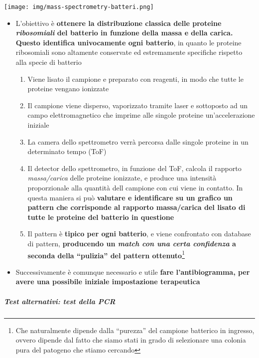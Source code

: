 \documentclass[italian,]{article}
\providecommand{\tightlist}{%
  \setlength{\itemsep}{0pt}\setlength{\parskip}{0pt}}
\begin{document}
\texttt{[image: img/mass-spectrometry-batteri.png]}~

\begin{itemize}
\tightlist
\item
  L'obiettivo è \textbf{ottenere la distribuzione classica delle
  proteine \emph{ribosomiali} del batterio in funzione della massa e
  della carica. Questo identifica univocamente ogni batterio}, in quanto
  le proteine ribosomiali sono altamente conservate ed estremamente
  specifiche rispetto alla specie di batterio

  \begin{enumerate}
  \def\labelenumi{\arabic{enumi}.}
  \tightlist
  \item
    Viene lisato il campione e preparato con reagenti, in modo che tutte
    le proteine vengano ionizzate
  \item
    Il campione viene disperso, vaporizzato tramite laser e sottoposto
    ad un campo elettromagnetico che imprime alle singole proteine
    un'accelerazione iniziale
  \item
    La camera dello spettrometro verrà percorsa dalle singole proteine
    in un determinato tempo (ToF)
  \item
    Il detector dello spettrometro, in funzione del ToF, calcola il
    rapporto \emph{massa/carica} delle proteine ionizzate, e produce una
    intensità proporzionale alla quantità dell campione con cui viene in
    contatto. In questa maniera si può \textbf{valutare e identificare
    su un grafico un pattern che corrisponde al rapporto massa/carica
    del lisato di tutte le proteine del batterio in questione}
  \item
    Il pattern è \textbf{tipico per ogni batterio}, e viene confrontato
    con database di pattern, \textbf{producendo un \emph{match con una
    certa confidenza} a seconda della ``pulizia'' del pattern
    ottenuto}\footnote{Che naturalmente dipende dalla ``purezza'' del
      campione batterico in ingresso, ovvero dipende dal fatto che siamo
      stati in grado di selezionare una colonia pura del patogeno che
      stiamo cercando}
  \end{enumerate}
\item
  Successivamente è comunque necessario e utile \textbf{fare
  l'antibiogramma, per avere una possibile iniziale impostazione
  terapeutica}
\end{itemize}

\hypertarget{test-alternativi-test-della-pcr}{%
\subparagraph{Test alternativi: test della
PCR}\label{test-alternativi-test-della-pcr}}
\end{document}
